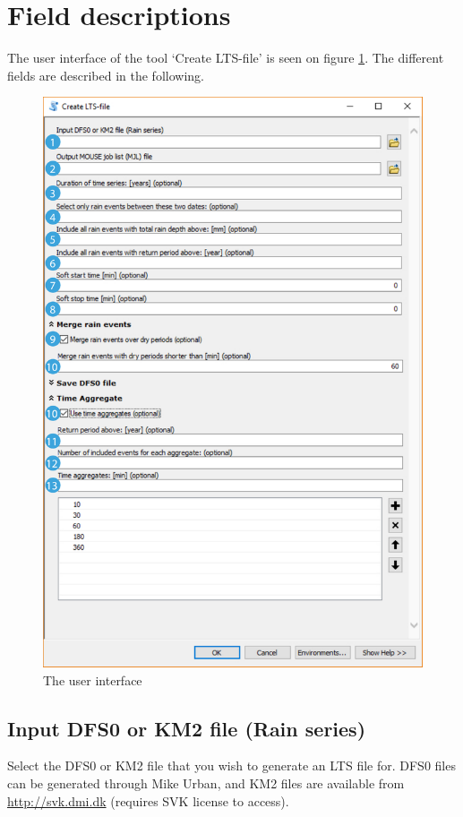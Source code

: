 \documentclass[a4paper,11pt]{refart}
\begin{document}
	\section{Field descriptions}
	The user interface of the tool `Create LTS-file' is seen on figure \ref{fig:Fields}. The different fields are described in the following.
	\begin{figure}[hbt!]\centering
		\includegraphics[scale=0.45]{Fields.pdf}
		\caption{The user interface}\label{fig:Fields}
	\end{figure}
	\subsection{Input DFS0 or KM2 file (Rain series)}
	\label{field1}
	Select the DFS0 or KM2 file that you wish to generate an LTS file for. DFS0 files can be generated through Mike Urban, and KM2 files are available from \url{http://svk.dmi.dk} (requires SVK license to access).
	
\end{document}
